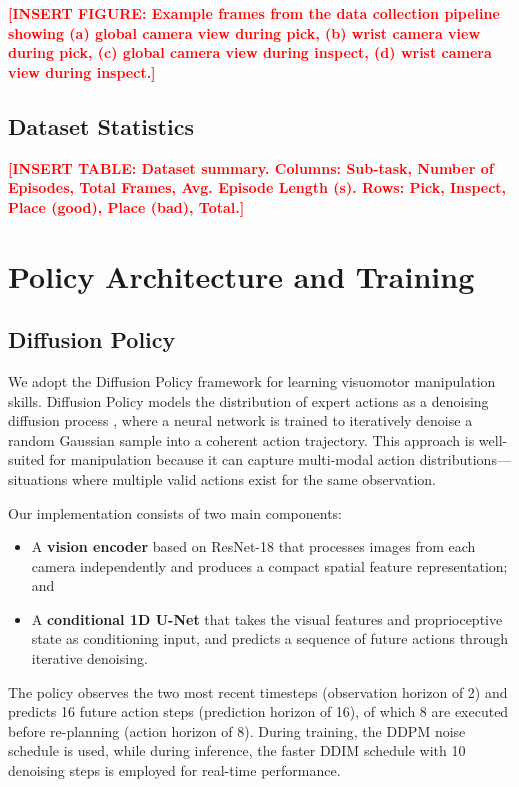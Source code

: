 \documentclass[conference]{IEEEtran}
\newcommand{\placeholder}[1]{\textcolor{red}{\textbf{[#1]}}}
\begin{document}
\placeholder{INSERT FIGURE: Example frames from the data collection pipeline showing (a) global camera view during pick, (b) wrist camera view during pick, (c) global camera view during inspect, (d) wrist camera view during inspect.}

\subsection{Dataset Statistics}

\placeholder{INSERT TABLE: Dataset summary. Columns: Sub-task, Number of Episodes, Total Frames, Avg. Episode Length (s). Rows: Pick, Inspect, Place (good), Place (bad), Total.}

\section{Policy Architecture and Training}

\subsection{Diffusion Policy}

We adopt the Diffusion Policy framework \cite{chi2023diffusion} for learning visuomotor manipulation skills. Diffusion Policy models the distribution of expert actions as a denoising diffusion process \cite{ho2020ddpm}, where a neural network is trained to iteratively denoise a random Gaussian sample into a coherent action trajectory. This approach is well-suited for manipulation because it can capture multi-modal action distributions---situations where multiple valid actions exist for the same observation.

Our implementation consists of two main components:
\begin{itemize}
    \item A \textbf{vision encoder} based on ResNet-18 \cite{he2016resnet} that processes images from each camera independently and produces a compact spatial feature representation; and
    \item A \textbf{conditional 1D U-Net} that takes the visual features and proprioceptive state as conditioning input, and predicts a sequence of future actions through iterative denoising.
\end{itemize}

The policy observes the two most recent timesteps (observation horizon of 2) and predicts 16 future action steps (prediction horizon of 16), of which 8 are executed before re-planning (action horizon of 8). During training, the DDPM noise schedule is used, while during inference, the faster DDIM \cite{song2020ddim} schedule with 10 denoising steps is employed for real-time performance.
\end{document}
